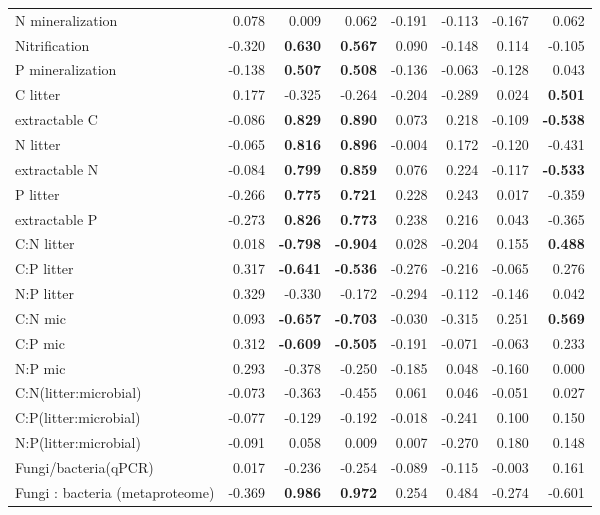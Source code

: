 \documentclass[10pt]{article}
\begin{document}
\begin{flushleft}
\begin{landscape}
\begin{table}[h!]
{\begin{tabular}{lrrrrrrr}
  N mineralization & 0.078 & 0.009 & 0.062 & -0.191 & -0.113 & -0.167 & 0.062 \\ 
  Nitrification & -0.320 & \textbf{ 0.630 } & \textbf{ 0.567 } & 0.090 & -0.148 & 0.114 & -0.105 \\ 
  P mineralization & -0.138 & \textbf{ 0.507 } & \textbf{ 0.508 } & -0.136 & -0.063 & -0.128 & 0.043 \\ 
  C litter & 0.177 & -0.325 & -0.264 & -0.204 & -0.289 & 0.024 & \textbf{ 0.501 } \\ 
  extractable C & -0.086 & \textbf{ 0.829 } & \textbf{ 0.890 } & 0.073 & 0.218 & -0.109 & \textbf{ -0.538 } \\ 
  N litter & -0.065 & \textbf{ 0.816 } & \textbf{ 0.896 } & -0.004 & 0.172 & -0.120 & -0.431 \\ 
  extractable N & -0.084 & \textbf{ 0.799 } & \textbf{ 0.859 } & 0.076 & 0.224 & -0.117 & \textbf{ -0.533 } \\ 
  P litter & -0.266 & \textbf{ 0.775 } & \textbf{ 0.721 } & 0.228 & 0.243 & 0.017 & -0.359 \\ 
  extractable P & -0.273 & \textbf{ 0.826 } & \textbf{ 0.773 } & 0.238 & 0.216 & 0.043 & -0.365 \\ 
  C:N litter & 0.018 & \textbf{ -0.798 } & \textbf{ -0.904 } & 0.028 & -0.204 & 0.155 & \textbf{ 0.488 } \\ 
  C:P litter & 0.317 & \textbf{ -0.641 } & \textbf{ -0.536 } & -0.276 & -0.216 & -0.065 & 0.276 \\ 
  N:P litter & 0.329 & -0.330 & -0.172 & -0.294 & -0.112 & -0.146 & 0.042 \\ 
  C:N mic & 0.093 & \textbf{ -0.657 } & \textbf{ -0.703 } & -0.030 & -0.315 & 0.251 & \textbf{ 0.569 } \\ 
  C:P mic & 0.312 & \textbf{ -0.609 } & \textbf{ -0.505 } & -0.191 & -0.071 & -0.063 & 0.233 \\ 
  N:P mic & 0.293 & -0.378 & -0.250 & -0.185 & 0.048 & -0.160 & 0.000 \\ 
  C:N(litter:microbial) & -0.073 & -0.363 & -0.455 & 0.061 & 0.046 & -0.051 & 0.027 \\ 
  C:P(litter:microbial) & -0.077 & -0.129 & -0.192 & -0.018 & -0.241 & 0.100 & 0.150 \\ 
  N:P(litter:microbial) & -0.091 & 0.058 & 0.009 & 0.007 & -0.270 & 0.180 & 0.148 \\ 
  Fungi/bacteria(qPCR) & 0.017 & -0.236 & -0.254 & -0.089 & -0.115 & -0.003 & 0.161 \\ 
  Fungi : bacteria (metaproteome) & -0.369 & \textbf{ 0.986 } & \textbf{ 0.972 } & 0.254 & 0.484 & -0.274 & -0.601 \\ 
   \hline
\end{tabular}
}
\end{table}\end{landscape}


\end{flushleft}
\end{document}
